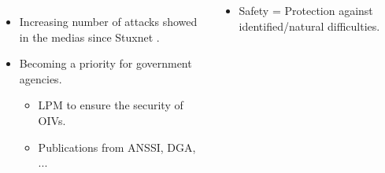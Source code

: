 \documentclass{beamer}
\begin{document}
\begin{frame}[t]
\begin{columns}[T]
\begin{column}{.49\textwidth}
\begin{tcolorbox}[adjusted title={\centering\large Industrial Systems}]
\begin{columns}
\begin{column}{.3\textwidth}
{                            }
                        \end{column}
                        \begin{column}{.3\textwidth}
                        \end{column}
                    \end{columns}
                    \vspace{1.1em}
                    \begin{itemize}
                        \item Increasing number of attacks showed in the medias since Stuxnet \cite{Lan11}.
                        \item Becoming a priority for government agencies.
                        \begin{itemize}
                            \item LPM to ensure the security of OIVs.
                            \item Publications from ANSSI, DGA, ...
                        \end{itemize}
                    \end{itemize}
                \end{tcolorbox}
            \end{column}
            \begin{column}{.49\textwidth}
                \begin{tcolorbox}[adjusted title={\centering\large Security concepts}]
                    \begin{itemize}
                        \item Safety = Protection against identified/natural difficulties.

\end{itemize}
\end{tcolorbox}
\end{column}
\end{columns}
\end{frame}
\end{document}
